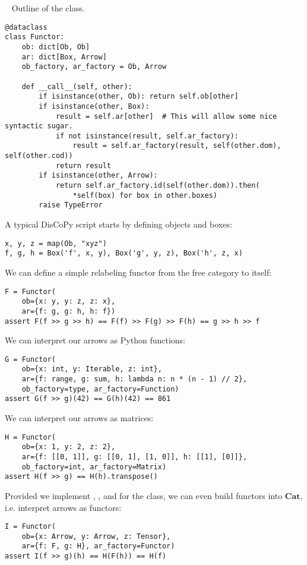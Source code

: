 \begin{python}~\label{listing:Functor}
{\normalfont Outline of the  class.}
\begin{verbatim}
@dataclass
class Functor:
    ob: dict[Ob, Ob]
    ar: dict[Box, Arrow]
    ob_factory, ar_factory = Ob, Arrow

    def __call__(self, other):
        if isinstance(other, Ob): return self.ob[other]
        if isinstance(other, Box):
            result = self.ar[other]  # This will allow some nice syntactic sugar.
            if not isinstance(result, self.ar_factory):
                result = self.ar_factory(result, self(other.dom), self(other.cod))
            return result
        if isinstance(other, Arrow):
            return self.ar_factory.id(self(other.dom)).then(
                *self(box) for box in other.boxes)
        raise TypeError
\end{verbatim}
\end{python}

\begin{example}
A typical DisCoPy script starts by defining objects and boxes:
\begin{verbatim}
x, y, z = map(Ob, "xyz")
f, g, h = Box('f', x, y), Box('g', y, z), Box('h', z, x)
\end{verbatim}
We can define a simple relabeling functor from the free category to itself:
\begin{verbatim}
F = Functor(
    ob={x: y, y: z, z: x},
    ar={f: g, g: h, h: f})
assert F(f >> g >> h) == F(f) >> F(g) >> F(h) == g >> h >> f
\end{verbatim}
We can interpret our arrows as Python functions:
\begin{verbatim}
G = Functor(
    ob={x: int, y: Iterable, z: int},
    ar={f: range, g: sum, h: lambda n: n * (n - 1) // 2},
    ob_factory=type, ar_factory=Function)
assert G(f >> g)(42) == G(h)(42) == 861
\end{verbatim}
We can interpret our arrows as matrices:
\begin{verbatim}
H = Functor(
    ob={x: 1, y: 2, z: 2},
    ar={f: [[0, 1]], g: [[0, 1], [1, 0]], h: [[1], [0]]},
    ob_factory=int, ar_factory=Matrix)
assert H(f >> g) == H(h).transpose()
\end{verbatim}
Provided we implement , ,  and  for the  class, we can even build functors into $\mathbf{Cat}$, i.e. interpret arrows as functors:
\begin{verbatim}
I = Functor(
    ob={x: Arrow, y: Arrow, z: Tensor},
    ar={f: F, g: H}, ar_factory=Functor)
assert I(f >> g)(h) == H(F(h)) == H(f)
\end{verbatim}
\end{example}

